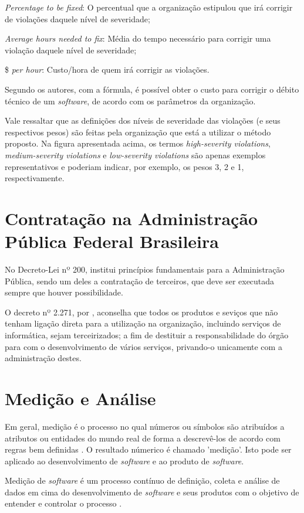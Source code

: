 \textit{Percentage to be fixed}: O percentual que a organização estipulou que irá corrigir
de violações daquele nível de severidade;

\textit{Average hours needed to fix}: Média do tempo necessário para corrigir uma violação
daquele nível de severidade;

\$ \textit{per hour}: Custo/hora de quem irá corrigir as violações.

Segundo os autores, com a fórmula, é possível obter o custo para corrigir o débito
técnico de um \textit{software}, de acordo com os parâmetros da organização.

Vale ressaltar que as definições dos níveis de severidade das violações (e seus respectivos pesos) são feitas pela organização que está a utilizar o método proposto.
Na figura apresentada acima, os termos \textit{high-severity violations}, \textit{medium-severity violations} e \textit{low-severity violations} são apenas exemplos representativos e poderiam indicar, por exemplo, os pesos 3, 2 e 1, respectivamente.

\section{Contratação na Administração Pública Federal Brasileira}

No Decreto-Lei nº 200, \cite{decreto200} institui princípios fundamentais para a
Administração Pública, sendo um deles a contratação de terceiros, que deve ser
executada sempre que houver possibilidade.

O decreto nº 2.271, por \cite{decreto2271}, aconselha que todos os produtos e seviços
que não tenham ligação direta para a utilização na organização, incluindo serviços
de informática, sejam terceirizados; a fim de destituir a responsabilidade do
órgão para com o desenvolvimento de vários serviços, privando-o unicamente com
a administração destes.

\section{Medição e Análise}
Em geral, medição é o processo no qual números ou símbolos são atribuídos a
atributos ou entidades do mundo real de forma a descrevê-los de acordo com regras
bem definidas \cite{fentonpfleeger}. O resultado númerico é chamado 'medição'.
Isto pode ser aplicado ao desenvolvimento de \textit{software} e ao produto de \textit{software}.

Medição de \textit{software} é um processo contínuo de definição, coleta e análise de
dados em cima do desenvolvimento de \textit{software} e seus produtos com o objetivo de
entender e controlar o processo \cite{egon}.



